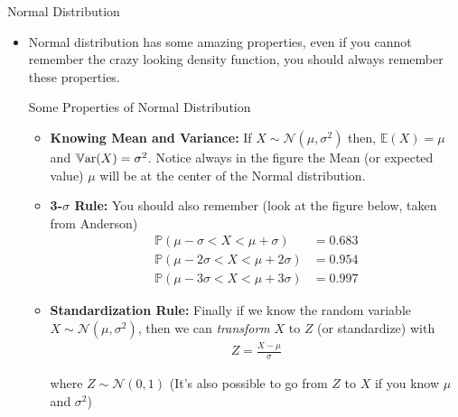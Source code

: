 \documentclass[8pt, usepdftitle = false]{beamer}
\begin{document}
\begin{frame}[allowframebreaks]{Normal Distribution}
\begin{itemize}
\framebreak


\item Normal distribution has some amazing properties, even if you cannot remember the crazy looking density function, you should always remember these properties.

\framebrreak

\begin{varblock}{Some Properties of Normal Distribution}

\begin{itemize}
\item \textbf{Knowing Mean and Variance:} If $X \sim \mathcal{N}(\mu, \sigma^2)$ then,  $	\mathbb{E}(X) = \mu$ and $\mathbb{V}\mathrm{ar}{(}X) = \sigma^2$. Notice always in the figure the Mean (or expected value) $\mu$ will be at the center of the Normal distribution. 

\medskip

\item \textbf{3-$\sigma$ Rule:} You should also remember (look at the figure below, taken from Anderson)
%
\begin{align*}
	\mathbb{P}(\mu - \sigma < X < \mu + \sigma) &= 0.683 \\
	\mathbb{P}(\mu - 2\sigma < X < \mu + 2\sigma) &= 0.954 \\
	\mathbb{P}(\mu - 3\sigma < X < \mu + 3\sigma) &= 0.997
\end{align*}



\item \textbf{Standardization Rule:} Finally if we know the random variable $X \sim \mathcal{N}(\mu, \sigma^2)$, then we can \emph{transform} $X$ to $Z$ (or standardize) with
%
\begin{align*}
Z = \frac{X - \mu}{\sigma}
\end{align*}

where $Z \sim \mathcal{N}(0, 1)$ (It's also possible to go from $Z$ to $X$ if you know $\mu$ and $\sigma^2$)


\end{itemize}
\end{varblock}
\end{itemize}
\end{frame}
\end{document}
